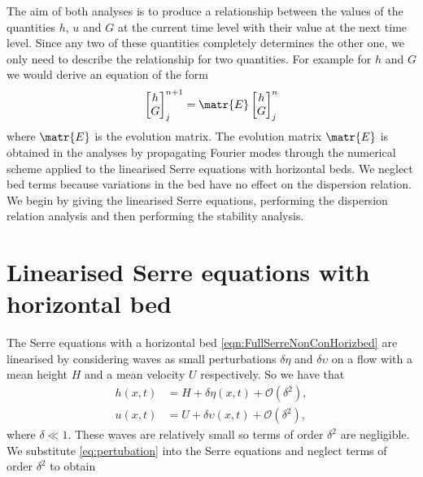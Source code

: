 The aim of both analyses is to produce a relationship between the values of the quantities $h$, $u$ and $G$ at the current time level with their value at the next time level. Since any two of these quantities completely determines the other one, we only need to describe the relationship for two quantities. For example for $h$ and $G$ we would derive an equation of the form
\begin{equation}
\label{eqn:linearanalaim}
\begin{bmatrix}
h \\G
\end{bmatrix}^{n+1}_j = \matr{E} \begin{bmatrix}
h \\G
\end{bmatrix}^{n}_j
\end{equation}
where $\matr{E}$ is the evolution matrix. The evolution matrix $\matr{E}$ is obtained in the analyses by propagating Fourier modes through the numerical scheme applied to the linearised Serre equations with horizontal beds. We neglect bed terms because variations in the bed have no effect on the dispersion relation. We begin by giving the linearised Serre equations, performing the dispersion relation analysis and then performing the stability analysis.
 
\section{Linearised Serre equations with horizontal bed}
The Serre equations with a horizontal bed \eqref{eqn:FullSerreNonConHorizbed} are linearised by considering waves as small perturbations $\delta\eta$ and $\delta\upsilon$ on a flow with a mean height $H$ and a mean velocity $U$ respectively. So we have that
\begin{subequations}
	\label{eq:pertubation}
\begin{align}
h(x,t) &= H + \delta \eta(x,t) + \mathcal{O}\left(\delta^2 \right), \\
u(x,t) &= U + \delta \upsilon(x,t) + \mathcal{O}\left(\delta^2 \right),
\end{align}
\end{subequations}
where $\delta \ll 1$. These waves are relatively small so terms of order $\delta^2$ are negligible. We substitute \eqref{eq:pertubation} into the Serre equations and neglect terms of order $\delta^2$ to obtain

